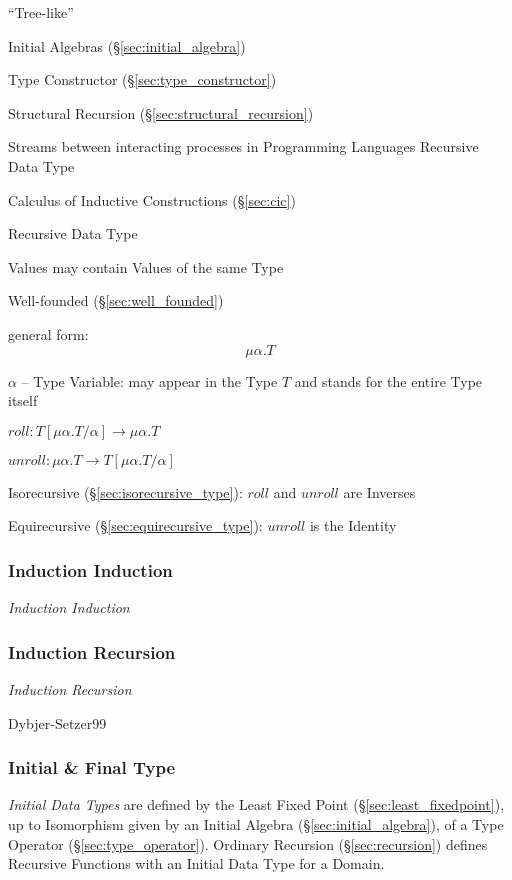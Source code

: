 ``Tree-like''

Initial Algebras (\S\ref{sec:initial_algebra})

Type Constructor (\S\ref{sec:type_constructor})

Structural Recursion (\S\ref{sec:structural_recursion})

Streams between interacting processes in Programming Languages
Recursive Data Type

Calculus of Inductive Constructions (\S\ref{sec:cic})


\asterism


Recursive Data Type

Values may contain Values of the same Type

Well-founded (\S\ref{sec:well_founded})

general form:
\[
  \mu\alpha.T
\]

$\alpha$ -- Type Variable: may appear in the Type $T$ and stands for
the entire Type itself

$roll : T[\mu\alpha.T/\alpha] \rightarrow \mu\alpha.T$

$unroll : \mu\alpha.T \rightarrow T[\mu\alpha.T/\alpha]$

Isorecursive (\S\ref{sec:isorecursive_type}): $roll$ and $unroll$
are Inverses

Equirecursive (\S\ref{sec:equirecursive_type}): $unroll$ is the
Identity



\subsubsection{Induction Induction}\label{sec:induction_induction}

\emph{Induction Induction}



\subsubsection{Induction Recursion}\label{sec:induction_recursion}

\emph{Induction Recursion}

Dybjer-Setzer99



\subsubsection{Initial \& Final Type}\label{sec:initial_final_type}

\emph{Initial Data Types} are defined by the Least Fixed Point
(\S\ref{sec:least_fixedpoint}), up to Isomorphism given by an Initial
Algebra (\S\ref{sec:initial_algebra}), of a Type Operator
(\S\ref{sec:type_operator}). Ordinary Recursion
(\S\ref{sec:recursion}) defines Recursive Functions with an Initial
Data Type for a Domain.


